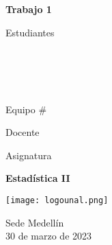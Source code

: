 \begin{titlepage}
   \Large{
   \begin{center}
       \vspace*{1cm}

       \textbf{Trabajo 1}

            
       \vspace{1.5cm}
       
       Estudiantes
       
       \vspace{0.5cm}
        
	\textbf{}\\    

  \textbf{}\\

	\textbf{}\\

	\textbf{}\\

              \vspace{1cm}
      Equipo \#
       
       Docente
       
       \vspace{0.5cm}

       \textbf{}
       
       \vspace{0.4cm}

       \vspace{1.4cm}
       
       Asignatura
       
       \vspace{0.5cm}

       \textbf{Estadística II}

       \vfill

            
       \vspace{0.4cm}
     
       \texttt{[image: logounal.png]}
            
       Sede Medellín\\
       30 de marzo de 2023
       
   \end{center}
   }
\end{titlepage}